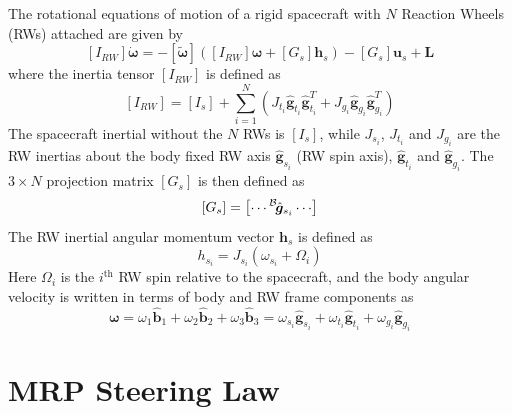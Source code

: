 \documentclass[]{BasiliskReportMemo}
\begin{document}
The rotational equations of motion of a rigid spacecraft with $N$ Reaction Wheels (RWs) attached are given by\cite{schaub}
\begin{equation}
	\label{eq:MS:2}
	[I_{RW}] \dot{\bm \omega} = - [\tilde{\bm \omega}] \left( 
	[I_{RW}] \bm\omega + [G_{s}] \bm h_{s} 
	\right) - [G_{s}] \bm u_{s} + \bm L
\end{equation}
where  the inertia tensor $[I_{RW}]$ is defined as
\begin{equation}
	\label{eq:MS:3}
	[I_{RW}] = [I_{s}] + \sum_{i=1}^{N} \left (J_{t_{i}} \hat{\bm g}_{t_{i}} \hat{\bm g}_{t_{i}}^{T} + J_{g_{i}} \hat{\bm g}_{g_{i}} \hat{\bm g}_{g_{i}}^{T}
	\right)
\end{equation}
The spacecraft inertial without the $N$ RWs is $[I_{s}]$, while $J_{s_{i}}$, $J_{t_{i}}$ and $J_{g_{i}}$ are the RW inertias about the body fixed RW axis $\hat{\bm g}_{s_{i}}$ (RW spin axis), $\hat{\bm g}_{t_{i}}$ and $\hat{\bm g}_{g_{i}}$.  The $3\times N$ projection matrix $[G_{s}]$ is then defined as
\begin{equation}
	\label{eq:MS:4}
	[G_{s}] = \begin{bmatrix}
		\cdots \leftexp{B}{\hat{\bm g}}_{s_{i}} \cdots
	\end{bmatrix}
\end{equation}
The RW inertial angular momentum vector $\bm h_{s}$ is defined as
\begin{equation}
	\label{eq:MS:5}
	h_{s_{i}} = J_{s_{i}} (\omega_{s_{i}} + \Omega_{i})
\end{equation}
Here $\Omega_{i}$ is the $i^{\text{th}}$ RW spin relative to the spacecraft, and the body angular velocity is written in terms of body and RW frame components as
\begin{equation}
	\label{eq:MS:6}
	\bm\omega = \omega_{1} \hat{\bm b}_{1} + \omega_{2} \hat{\bm b}_{2} + \omega_{3} \hat{\bm b}_{3}
	= \omega_{s_{i}} \hat{\bm g}_{s_{i}} +  \omega_{t_{i}} \hat{\bm g}_{t_{i}} +  \omega_{g_{i}} \hat{\bm g}_{g_{i}}
\end{equation}









\section{MRP Steering Law}
\end{document}
